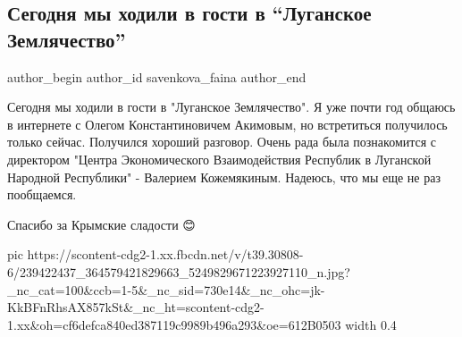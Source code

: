  
 
 
 
 
 
\subsection{Сегодня мы ходили в гости в \enquote{Луганское Землячество}}
\label{sec:23_08_2021.fb.savenkova_faina.1.luganskoje_zemljachestvo_gosti}
 
\ifcmt
 author_begin
   author_id savenkova_faina
 author_end
\fi

Сегодня мы ходили в гости в "Луганское Землячество". Я уже почти год общаюсь в
интернете с Олегом Константиновичем Акимовым, но встретиться получилось только
сейчас. Получился хороший разговор. Очень рада была познакомится с директором
"Центра Экономического Взаимодействия Республик в Луганской Народной
Республики" - Валерием Кожемякиным. Надеюсь, что мы еще не раз пообщаемся.

Спасибо за Крымские сладости 😊

\ifcmt
  pic https://scontent-cdg2-1.xx.fbcdn.net/v/t39.30808-6/239422437_364579421829663_5249829671223927110_n.jpg?_nc_cat=100&ccb=1-5&_nc_sid=730e14&_nc_ohc=jk-KkBFnRhsAX857kSt&_nc_ht=scontent-cdg2-1.xx&oh=cf6defca840ed387119c9989b496a293&oe=612B0503
  width 0.4
\fi

